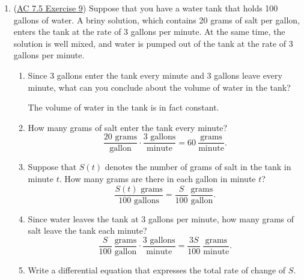 \documentclass[10pt]{article}
\newenvironment{red}{\color{red}}{\ignorespacesafterend}
\begin{document}
\begin{enumerate}[leftmargin=0pt]
\begin{enumerate}
    \begin{red}
        So, I mean, probably not, for several reasons: 
        \begin{itemize}
            \item This function $W(t)$ is always increasing and has no horizontal asymptote; the model thus predicts that the person will keep growing forever.
            \item This model predicts a pretty low weight for someone who's 20 years old: $W(240) \approx 64.3$ pounds. That's a very small adult! I think this model doesn't know about various ``growth spurts'' that humans go through.
        \end{itemize}
    \end{red}

\end{enumerate}


\item (\href{https://faculty.gvsu.edu/boelkinm/Home/ACS/sec-7-5-modeling.html#jmX}{AC 7.5 Exercise 9}) Suppose that you have a water tank that holds 100 gallons of water. A briny solution, which contains 20 grams of salt per gallon, enters the tank at the rate of 3 gallons per minute. At the same time, the solution is well mixed, and water is pumped out of the tank at the rate of 3 gallons per minute.
\begin{enumerate}
    \item Since 3 gallons enter the tank every minute and 3 gallons leave every minute, what can you conclude about the volume of water in the tank?

    \begin{red}
        The volume of water in the tank is in fact constant.
    \end{red}
    \item How many grams of salt enter the tank every minute?
    \begin{red}
        \[\dfrac{20\text{ grams}}{\text{gallon}}\cdot \dfrac{3\text{ gallons}}{\text{minute}} = 60\ \dfrac{\text{grams}}{\text{minute}}.\]
    \end{red}
    \item Suppose that $S(t)$ denotes the number of grams of salt in the tank in minute $t$. How many grams are there in each gallon in minute $t$?
    \begin{red}
        \[\dfrac{S(t)\text{ grams}}{100\text{ gallons}} = \dfrac{S}{100}\ \dfrac{\text{grams}}{\text{gallon}}.\]
    \end{red}
    \item Since water leaves the tank at 3 gallons per minute, how many grams of salt leave the tank each minute?
    \begin{red}
        \[\dfrac{S}{100}\ \dfrac{\text{grams}}{\text{gallon}}\cdot  \dfrac{3\text{ gallons}}{\text{minute}} =\dfrac{3S}{100}\ \dfrac{\text{grams}}{\text{minute}}. \]
    \end{red}
    \item Write a differential equation that expresses the total rate of change of $S$.


\end{enumerate}
\end{enumerate}
\end{document}

